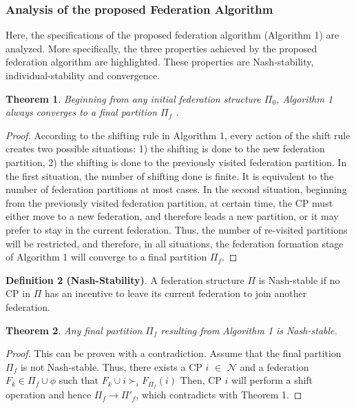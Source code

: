 \documentclass[preprint]{elsarticle}
\newtheorem{theorem}{Theorem}
\theoremstyle{definition}
\theoremstyle{remark}
\theoremstyle{property}
\begin{document}
\subsubsection{Analysis of the proposed Federation Algorithm}

Here, the specifications of the proposed federation
algorithm (Algorithm 1) are analyzed. More specifically, the three properties achieved by the proposed
federation algorithm are highlighted. These properties are Nash-stability, individual-stability
and convergence.


\begin{theorem}
Beginning from any initial federation structure
$\Pi_{0}$, Algorithm 1 always converges to a final partition $\Pi_{f}$ .

\end{theorem}

\begin{proof}
According to the shifting rule in Algorithm 1,
every action of the shift rule creates two possible situations:
1) the shifting is done to the new federation
partition, 2) the shifting is done to the previously visited
federation partition. In the first situation, the number
of shifting done is finite. It is equivalent to the
number of federation partitions at most cases. In the
second situation, beginning from the previously visited
federation partition, at certain time, the CP must either
move to a new federation, and therefore leads a new
partition, or it may prefer to stay in the current federation.
Thus, the number of re-visited partitions will be restricted,
and therefore, in all situations, the federation formation
stage of Algorithm 1 will converge to a final partition
$\Pi_{f}$.

\end{proof}

\textbf{Definition 2 (Nash-Stability)}. A federation structure
$\Pi$ is Nash-stable if no CP in $\Pi$ has an incentive to leave
its current federation to join another federation.

\begin{theorem}
Any final partition $\Pi_{f}$ resulting from
Algorithm 1 is Nash-stable.
\end{theorem}

\begin{proof}
This can be proven with a contradiction. Assume
that the final partition $\Pi_{f}$ is not Nash-stable. Thus, there exists
a CP $i$ $\in$ $\mathcal{N}$ and a federation $F_{k} \in \Pi_{f} \cup \phi$ such that $F_{k} \cup
{i} \succ_{i} F_{\Pi_{f}}(i)$ Then, CP $i$ will perform a shift operation and
hence $\Pi_{f} \rightarrow \Pi'_{f}$, which contradicts with Theorem 1.
\end{proof}
\end{document}
